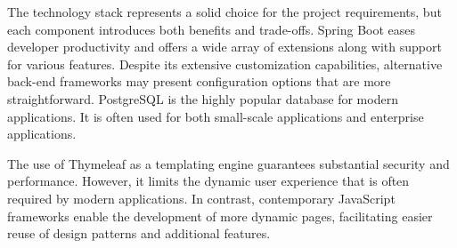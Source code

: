 The technology stack represents a solid choice for the project requirements, but each component introduces both benefits and trade-offs.
Spring Boot eases developer productivity and offers a wide array of extensions along with support for various features.
Despite its extensive customization capabilities, alternative back-end frameworks may present configuration options that are more straightforward.
PostgreSQL is the highly popular database for modern applications.
It is often used for both small-scale applications and enterprise applications.\cite{ThebenefitsofPostgreSQL,GerritMeyer2025}

The use of Thymeleaf as a templating engine guarantees substantial security and performance.
However, it limits the dynamic user experience that is often required by modern applications.
In contrast, contemporary JavaScript frameworks enable the development of more dynamic pages, facilitating easier reuse of design patterns and additional features.
